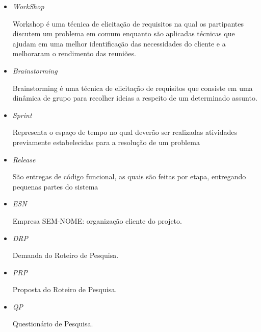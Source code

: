 \begin{itemize}
 
	\item \textit{WorkShop}

		 Workshop é uma técnica de elicitação de requisitos na qual os partipantes discutem um problema em comum enquanto são aplicadas técnicas que ajudam em uma melhor identificação das necessidades do cliente e a melhoraram o rendimento das reuniões.

	\item \textit{Brainstorming}

		 Brainstorming é uma técnica de elicitação de requisitos que consiste em uma dinâmica de grupo para recolher ideias a respeito de um determinado assunto.

	\item \textit{Sprint}

		Representa o espaço de tempo no qual deverão ser realizadas atividades previamente estabelecidas para a resolução de um problema %

	\item \textit{Release}

		São entregas de código funcional, as quais são feitas por etapa, entregando pequenas partes do sistema %

	\item \textit{ESN}

		Empresa SEM-NOME: organização cliente do projeto.

	\item \textit{DRP}

		Demanda do Roteiro de Pesquisa.

	\item \textit{PRP}

		Proposta do Roteiro de Pesquisa.

	\item \textit{QP}

		Questionário de Pesquisa.

\end{itemize}